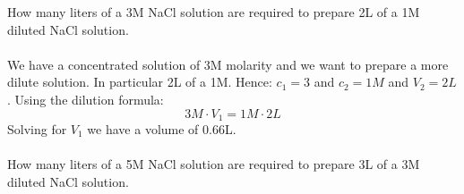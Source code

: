 \documentclass[main.tex]{subfiles} %
\begin{document}
\begin{description}
\begin{example} %
How many liters of a 3M NaCl solution are required to prepare 2L of a 1M diluted NaCl solution.
\\
\\
We have a concentrated solution of 3M molarity and we want to prepare a more dilute solution. In particular 2L of a 1M. Hence: $c_1=3$ and $c_2=1M$ and $V_2=2L$. Using the dilution formula:
 \begin{equation*}
 3M \cdot V_1=1M \cdot  2L 
\end{equation*}
Solving for $V_1$ we have a volume of 0.66L.
\\
\faDiamond\ \\
How many liters of a 5M NaCl solution are required to prepare 3L of a 3M diluted NaCl solution.
  \\
\end{example}%

\end{description}



\end{document}
